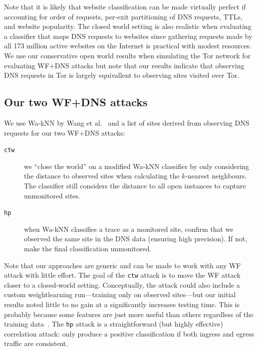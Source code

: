 Note that it is likely that website classification can be made
virtually perfect if accounting for order of requests, per-exit partitioning of
DNS requests, TTLs, and website popularity. The closed world setting
is also realistic when evaluating a classifier that maps DNS requests to
websites since gathering requests made by all 173 million active websites on the
Internet is practical with modest resources.
We use our conservative open world results when simulating the Tor network for
evaluating WF+DNS attacks but
note that our results indicate that observing DNS requests in Tor is
largely equivallent to observing sites visited over Tor.

\subsection{Our two WF+DNS attacks}
We use Wa-kNN by Wang et al.~\cite{Wang2014a} and a list of sites derived from
observing DNS requests for our two WF+DNS attacks:

\begin{description}
	\item[\texttt{ctw}] we ``close the world''
	on a modified Wa-kNN classifier by only considering the distance to observed
	sites when calculating the $k$-nearest neighbours. The classifier still
	considers the distance to all open instances to capture unmonitored sites.
	\item[\texttt{hp}] when Wa-kNN classifies a trace as a monitored site, confirm
	that we observed the same site in the DNS data (ensuring high precision). If
	not, make the final classification unmonitored.
\end{description}

Note that our approaches are generic and can be made to work with any WF attack
with little effort. The goal of the \texttt{ctw} attack is to move the WF attack
closer to a closed-world setting. Conceptually, the attack could also include
a custom weightlearning run---training only on observed sites---but our initial
results noted little to no gain at a significantly increases testing time.
This is probably because some features are just more useful than others
regardless of the training data~\cite{kfingerprinting}. The \texttt{hp} attack
is a straightforward (but highly effective) correlation attack: only produce
a positive classification if both ingress and egress traffic are consistent.
